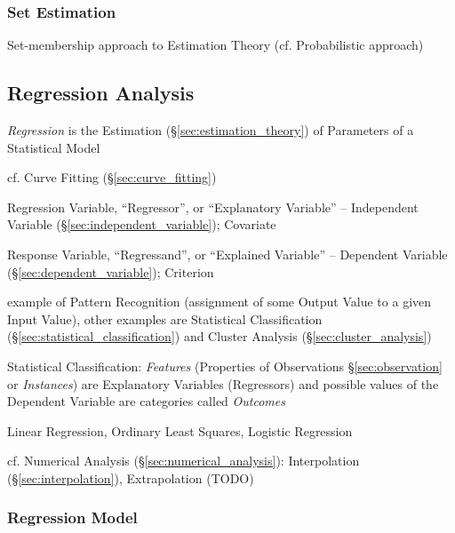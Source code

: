 


\subsubsection{Set Estimation}\label{sec:set_estimation}

Set-membership approach to Estimation Theory (cf. Probabilistic approach)



\subsection{Regression Analysis}\label{sec:regression_analysis}

\emph{Regression} is the Estimation (\S\ref{sec:estimation_theory}) of
Parameters of a Statistical Model

\fist cf. Curve Fitting (\S\ref{sec:curve_fitting})

Regression Variable, ``Regressor'', or ``Explanatory Variable'' -- Independent
Variable (\S\ref{sec:independent_variable}); Covariate

Response Variable, ``Regressand'', or ``Explained Variable'' -- Dependent
Variable (\S\ref{sec:dependent_variable}); Criterion

example of Pattern Recognition (assignment of some Output Value to a given Input
Value), other examples are Statistical Classification
(\S\ref{sec:statistical_classification}) and Cluster Analysis
(\S\ref{sec:cluster_analysis})

Statistical Classification: \emph{Features} (Properties of Observations
\S\ref{sec:observation} or \emph{Instances}) are Explanatory Variables
(Regressors) and possible values of the Dependent Variable are categories called
\emph{Outcomes}

Linear Regression, Ordinary Least Squares, Logistic Regression

cf. Numerical Analysis (\S\ref{sec:numerical_analysis}): Interpolation
(\S\ref{sec:interpolation}), Extrapolation (TODO)



\subsubsection{Regression Model}\label{sec:regression_model}

